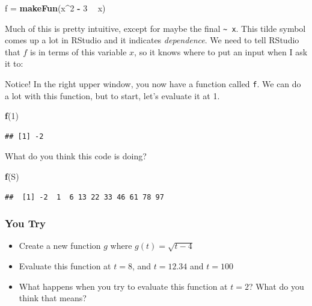 \documentclass[
]{book}
\newenvironment{Shaded}{\begin{snugshade}}{\end{snugshade}}
\newcommand{\DecValTok}[1]{\textcolor[rgb]{0.00,0.00,0.81}{#1}}
\newcommand{\KeywordTok}[1]{\textcolor[rgb]{0.13,0.29,0.53}{\textbf{#1}}}
\newcommand{\NormalTok}[1]{#1}
\newcommand{\OperatorTok}[1]{\textcolor[rgb]{0.81,0.36,0.00}{\textbf{#1}}}
\newcommand{\StringTok}[1]{\textcolor[rgb]{0.31,0.60,0.02}{#1}}
\providecommand{\tightlist}{%
  \setlength{\itemsep}{0pt}\setlength{\parskip}{0pt}}
\begin{document}
\begin{Shaded}
\begin{Highlighting}[]
\NormalTok{f =}\StringTok{ }\KeywordTok{makeFun}\NormalTok{(x}\OperatorTok{^}\DecValTok{2} \OperatorTok{-}\StringTok{ }\DecValTok{3} \OperatorTok{~}\StringTok{ }\NormalTok{x)}
\end{Highlighting}
\end{Shaded}

Much of this is pretty intuitive, except for maybe the final \texttt{\textasciitilde{}\ x}. This tilde symbol comes up a lot in RStudio and it indicates \emph{dependence}. We need to tell RStudio that \(f\) is in terms of this variable \(x\), so it knows where to put an input when I ask it to:

Notice! In the right upper window, you now have a function called \texttt{f}. We can do a lot with this function, but
to start, let's evaluate it at 1.

\begin{Shaded}
\begin{Highlighting}[]
\KeywordTok{f}\NormalTok{(}\DecValTok{1}\NormalTok{)}
\end{Highlighting}
\end{Shaded}

\begin{verbatim}
## [1] -2
\end{verbatim}

What do you think this code is doing?

\begin{Shaded}
\begin{Highlighting}[]
\KeywordTok{f}\NormalTok{(S)}
\end{Highlighting}
\end{Shaded}

\begin{verbatim}
##  [1] -2  1  6 13 22 33 46 61 78 97
\end{verbatim}

\hypertarget{you-try-2}{%
\subsubsection{You Try}\label{you-try-2}}

\begin{itemize}
\tightlist
\item
  Create a new function \(g\) where \(g(t) = \sqrt{t-4}\)
\item
  Evaluate this function at \(t=8\), and \(t=12.34\) and \(t=100\)
\item
  What happens when you try to evaluate this function at \(t=2\)? What do you think that means?
\end{itemize}
\end{document}
